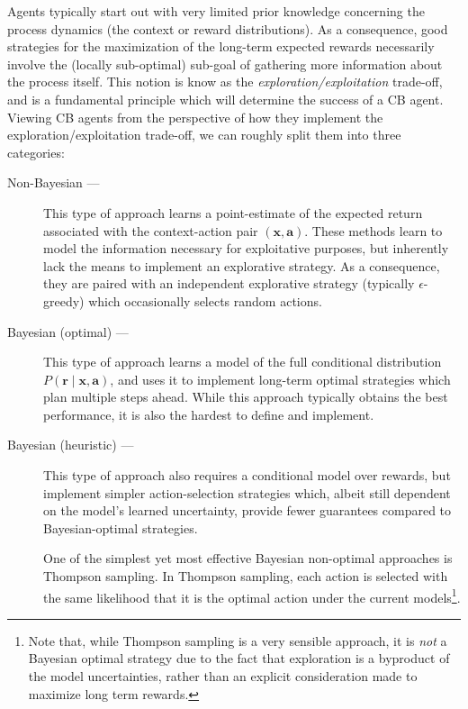 \documentclass[11pt]{article}
\begin{document}
Agents typically start out with very limited prior knowledge concerning the
process dynamics (the context or reward distributions).  As a consequence, good
strategies for the maximization of the long-term expected rewards necessarily
involve the (locally sub-optimal) sub-goal of gathering more information about
the process itself.  This notion is know as the \emph{exploration/exploitation}
trade-off, and is a fundamental principle which will determine the success of
a CB agent.  Viewing CB agents from the perspective of how they implement the
exploration/exploitation trade-off, we can roughly split them into three
categories:
%
\begin{description}
  \item[Non-Bayesian ---]  This type of approach learns a point-estimate of the
    expected return associated with the context-action pair $(\bm x, \bm a)$.
    These methods learn to model the information necessary for exploitative
    purposes, but inherently lack the means to implement an explorative
    strategy.  As a consequence, they are paired with an independent
    explorative strategy (typically $\epsilon$-greedy) which occasionally
    selects random actions.
  \item[Bayesian (optimal) ---]  This type of approach learns a model of the
    full conditional distribution $P(\bm r\mid \bm x, \bm a)$, and uses it to
    implement long-term optimal strategies which plan multiple steps ahead.
    While this approach typically obtains the best performance, it is also the
    hardest to define and implement.
  \item[Bayesian (heuristic) ---]  This type of approach also requires
    a conditional model over rewards, but implement simpler action-selection
    strategies which, albeit still dependent on the model's learned uncertainty,
    provide fewer guarantees compared to Bayesian-optimal strategies.  

    One of the simplest yet most effective Bayesian non-optimal approaches is
    Thompson sampling.  In Thompson sampling, each action is selected with the
    same likelihood that it is the optimal action under the current
    models\footnote{Note that, while Thompson sampling is a very sensible approach, it is \emph{not} a Bayesian optimal strategy due to the fact that exploration is a byproduct of the model uncertainties, rather than an explicit consideration made to maximize long term rewards.}.
\end{description}
\end{document}
